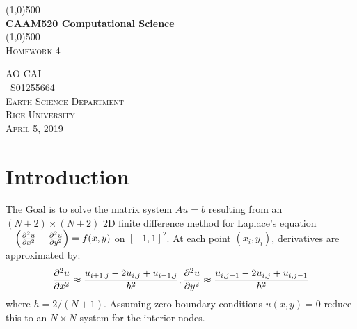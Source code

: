 \documentclass[12pt]{article}
\begin{document}
\begin{titlepage}
	\begin{center}
	\line(1,0){500}\\
	[0.25in]
	\huge{\bfseries CAAM520 Computational Science}\\
	[2mm]
	\line(1,0){500}\\
	[1.5cm]
	\textsc{\LARGE Homework 4}\\
	[8cm] 
	\end{center}
	\begin{flushright}
	\textsc{\large AO CAI \\
	\ S01255664\\
	Earth Science Department\\
	Rice University\\
	April 5, 2019\\}
	\end{flushright}
\end{titlepage}
\tableofcontents
\thispagestyle{empty}
\cleardoublepage
\setcounter{page}{1}
\section{Introduction}\label{sec:intro}
The Goal is to solve the matrix system {\bfseries$Au=b$} resulting from an $(N+2)\times(N+2)$ 2D finite difference method for Laplace's equation $-\left(\pdv[2]{u}{x} + \pdv[2]{u}{y} \right) = f(x,y)$ on $[-1,1]^2$. At each point $(x_i,y_i)$, derivatives are approximated by:
$$\pdv[2]{u}{x} \approx \frac{u_{i+1,j}-2u_{i,j}+u_{i-1,j}}{h^2}, \pdv[2]{u}{y} \approx \frac{u_{i,j+1}-2u_{i,j}+u_{i,j-1}}{h^2}$$
where $h = 2/(N+1)$. Assuming zero boundary conditions $u(x,y) = 0$ reduce this to an $N \times N$ system for the interior nodes.
\end{document}

